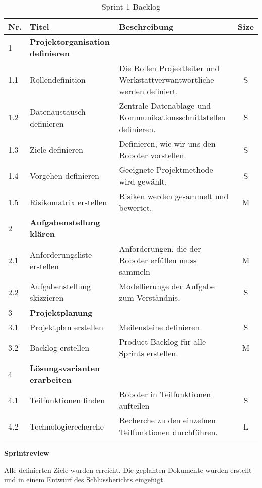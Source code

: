 \begin{table}[H]
\centering
\small
\begin{tabularx}{\textwidth}{|l|l|X|c|}
\hline
  \textbf{Nr.} & \textbf{Titel} & \textbf{Beschreibung} & \textbf{Size}\\
  \hline
  1  & \textbf{Projektorganisation definieren} &&\\
  \hline
  1.1  & Rollendefinition & Die Rollen Projektleiter und Werkstattverwantwortliche werden definiert. & S\\
  \hline
  1.2 & Datenaustausch definieren & Zentrale Datenablage und Kommunikationsschnittstellen definieren.& S\\
  \hline
  1.3 & Ziele definieren & Definieren, wie wir uns den Roboter vorstellen. & S\\
  \hline
  1.4 & Vorgehen definieren & Geeignete Projektmethode wird gewählt. & S\\
  \hline
    1.5 & Risikomatrix erstellen & Risiken werden gesammelt und bewertet. & M\\
  \hline
  2 & \textbf{Aufgabenstellung klären} && \\
  \hline
  2.1 & Anforderungsliste erstellen & Anforderungen, die der Roboter erfüllen muss sammeln& M \\
  \hline
  2.2 & Aufgabenstellung skizzieren & Modellierunge der Aufgabe zum Verständnis. & S \\
  \hline
  3 & \textbf{Projektplanung} && \\
  \hline
  3.1 & Projektplan erstellen & Meilensteine definieren. & S \\
  \hline
  3.2 & Backlog erstellen & Product Backlog für alle Sprints erstellen. & M \\
  \hline
  4 & \textbf{Lösungsvarianten erarbeiten} && \\
  \hline
  4.1 & Teilfunktionen finden & Roboter in Teilfunktionen aufteilen & S \\
  \hline
  4.2 & Technologierecherche & Recherche zu den einzelnen Teilfunktionen  durchführen. & L\\
  \hline
 
\end{tabularx}
\caption{Sprint 1 Backlog}
\label{table:sprint1-backlog}
\end{table}

\textbf{Sprintreview}

Alle definierten Ziele wurden erreicht. Die geplanten Dokumente wurden erstellt und in einem Entwurf des Schlussberichts eingefügt.

